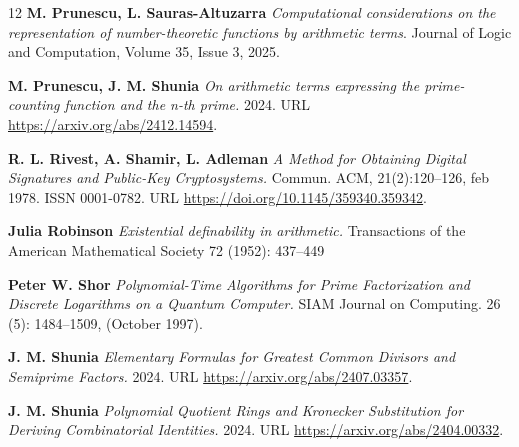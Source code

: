 \documentclass[10pt]{article}
\theoremstyle{plain}
\begin{document}
\begin{thebibliography}{12}
 {\bf M. Prunescu, L. Sauras-Altuzarra} {\it Computational considerations on the representation of number-theoretic functions by arithmetic terms}.  Journal of Logic and Computation, Volume 35, Issue 3, 2025.

 {\bf M. Prunescu, J. M. Shunia} {\it On arithmetic terms expressing the prime-counting function and
the n-th prime.} 2024. URL \url{https://arxiv.org/abs/2412.14594}.

 {\bf R. L. Rivest, A. Shamir, L. Adleman} {\it A Method for Obtaining Digital Signatures and
Public-Key Cryptosystems.} Commun. ACM, 21(2):120–126, feb 1978. ISSN 0001-0782. URL
\url{https://doi.org/10.1145/359340.359342}.

 {\bf Julia Robinson} {\it Existential definability in arithmetic.} Transactions of the American Mathematical Society 72 (1952): 437–449

 {\bf Peter W. Shor}   {\it Polynomial-Time Algorithms for Prime Factorization and Discrete Logarithms on a Quantum Computer.} SIAM Journal on Computing. 26 (5): 1484–1509, (October 1997).

 {\bf J. M. Shunia} {\it Elementary Formulas for Greatest Common Divisors and Semiprime Factors.} 2024.
URL \url{https://arxiv.org/abs/2407.03357}.

 {\bf J. M. Shunia} {\it Polynomial Quotient Rings and Kronecker Substitution for Deriving Combinatorial
Identities.} 2024. URL \url{https://arxiv.org/abs/2404.00332}.

\end{thebibliography}
\end{document}
